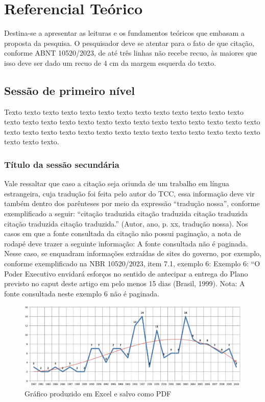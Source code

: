 

\chapter{Referencial Teórico}

Destina-se a apresentar as leituras e os fundamentos teóricos que embasam a proposta da pesquisa. O pesquisador deve se atentar para o fato de que citação, conforme ABNT 10520/2023, de até três linhas não recebe recuo, às maiores que isso deve ser dado um recuo de 4 cm da margem esquerda do texto.

\section{Sessão de primeiro nível}

Texto texto texto texto texto texto texto texto texto texto texto texto texto texto texto texto texto texto texto texto texto texto texto texto texto texto texto texto texto texto texto texto texto texto texto texto texto texto texto texto texto texto texto texto.

\subsection{Título da sessão secundária}

Vale ressaltar que caso a citação seja oriunda de um trabalho em língua estrangeira, cuja tradução foi feita pelo autor do TCC, essa informação deve vir também dentro dos parênteses por meio da expressão “tradução nossa”, conforme exemplificado a seguir: “citação traduzida citação traduzida citação traduzida citação traduzida citação traduzida.” (Autor, ano, p. xx, tradução nossa).
Nos casos em que a fonte consultada da citação não possui paginação, a nota de rodapé deve trazer a seguinte informação: A fonte consultada não é paginada. Nesse caso, se enquadram informações extraídas de sites do governo, por exemplo, conforme exemplificado na NBR 10520/2023, item 7.1, exemplo 6: Exemplo 6: “O Poder Executivo envidará esforços no sentido de antecipar a entrega do Plano previsto no caput deste artigo em pelo menos 15 dias (Brasil, 1999). Nota: A fonte consultada neste exemplo 6 não é paginada.

\begin{figure}[htb]
	\caption{\label{fig_grafico}Gráfico produzido em Excel e salvo como PDF}
	\begin{center}
	    \includegraphics[scale=0.5]{imagens/abntex2-modelo-img-grafico.pdf}
	\end{center}
\end{figure}



